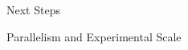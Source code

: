 \begin{block}{Next Steps}
\vspace{-1ex}
{\small
\begin{alertblock}{Parallelism and Experimental Scale}

\end{alertblock}
}
\vspace{-1ex}
\end{block}
